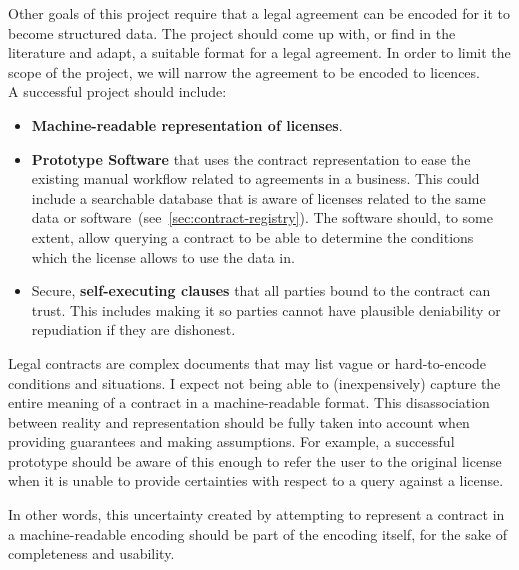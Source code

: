 

Other goals of this project require that a legal agreement can be encoded for it to become
structured data.
The project should come up with, or find in the literature and adapt, a suitable format for a legal
agreement.
In order to limit the scope of the project, we will narrow the agreement to be encoded to
licences.\\

A successful project should include:
\begin{itemize}
    \item \textbf{Machine-readable representation of licenses}.
    \item \textbf{Prototype Software} that uses the contract representation to ease the existing
    manual workflow related to agreements in a business.
    This could include a searchable database that is aware of licenses related to the same data or
    software~(see~\ref{sec:contract-registry}).
    The software should, to some extent, allow querying a contract to be able to determine the
    conditions which the license allows to use the data in.
    \item Secure, \textbf{self-executing clauses} that all parties bound to the contract can trust.
    This includes making it so parties cannot have plausible deniability or repudiation if they are
    dishonest.
\end{itemize}

Legal contracts are complex documents that may list vague or hard-to-encode conditions and
situations.
I expect not being able to (inexpensively) capture the entire meaning of a contract in a
machine-readable format.
This disassociation between reality and representation should be fully taken into account when
providing guarantees and making assumptions.
For example, a successful prototype should be aware of this enough to refer the user to the original
license when it is unable to provide certainties with respect to a query against a license.

In other words, this uncertainty created by attempting to represent a contract in a machine-readable
encoding should be part of the encoding itself, for the sake of completeness and usability.\\

